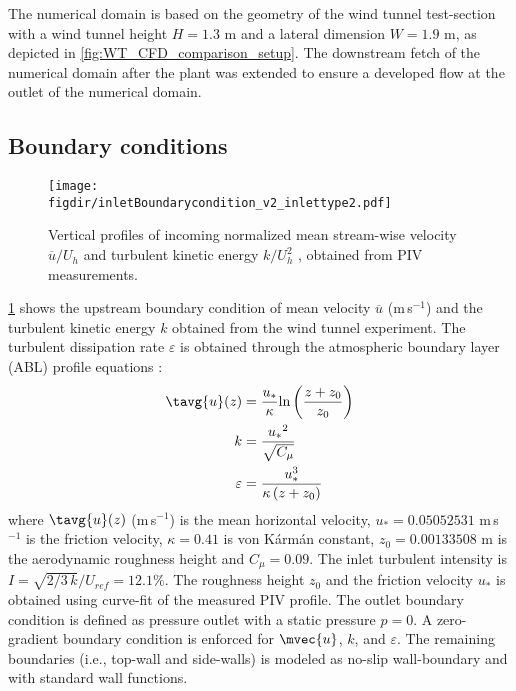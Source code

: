 The numerical domain is based on the geometry of the wind tunnel test-section with a wind tunnel height $H=1.3$ m and a lateral dimension $W=1.9$ m, as depicted in \cref{fig:WT_CFD_comparison_setup}. The downstream fetch of the numerical domain after the plant was extended to ensure a developed flow at the outlet of the numerical domain. %

\subsection{Boundary conditions}

\begin{figure}[t]
	\centering
	\texttt{[image: \\figdir/inletBoundarycondition\_v2\_inlettype2.pdf]}
	\caption{Vertical profiles of incoming normalized  mean stream-wise velocity $\overline{u}/U_h$ and   turbulent kinetic energy $k/U_h^2$ , obtained from PIV measurements.}
	\label{fig:boundaryprofile}
\end{figure}

\cref{fig:boundaryprofile} shows the upstream boundary condition of mean velocity $\overline{u}$ (m\,s$^{-1}$) and the turbulent kinetic energy $k$ obtained from the wind tunnel experiment. The turbulent dissipation rate $\varepsilon$ is obtained through the atmospheric boundary layer (ABL) profile equations \citep{Richards1993}:
\begin{align}
	\tavg{u}(z) &= \frac{{{u_*}}}{\kappa }{\text{ln}}\left( {\frac{{z + {z_0}}}{{{z_0}}}} \right) \\
	k &= \frac{{{u_*}^2}}{{\sqrt {{C_\mu }} }} \\
	\varepsilon  &= \frac{{u_*^3}}{{\kappa \left( {z + {z_0}} \right)}}
	\label{eq:ableq}
\end{align}
where $\tavg{u}(z)$ (m\,s$^{-1}$) is the mean horizontal velocity, $u_*= \num{0.05052531}$ m\,s$^{-1}$ is  the friction velocity, $\kappa=0.41$ is von K\'arm\'an constant, $z_0 = \num{0.00133508}$ m is the aerodynamic roughness height and $C_{\mu}=0.09$. The inlet turbulent intensity is $I = \sqrt{2/3\,k}/U_{ref} = 12.1 \%$. The roughness height $z_0$ and the friction velocity $u_*$ is obtained using curve-fit of the measured PIV profile. The outlet boundary condition is defined as pressure outlet with a static pressure $p=0$. A zero-gradient boundary condition is enforced for $\mvec{u}$, $k$, and $\varepsilon$. The remaining boundaries (i.e., top-wall and side-walls) is modeled as no-slip wall-boundary and with standard wall functions.

